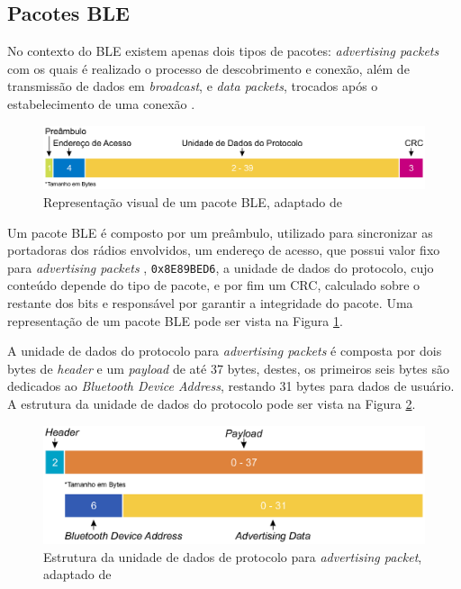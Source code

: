 \documentclass[a5paper]{ufsc-thesis}  %
\begin{document}
\subsection{Pacotes BLE}
No contexto do BLE existem apenas dois tipos de pacotes: \textit{advertising packets} com os quais é realizado o processo de descobrimento e conexão, além de transmissão de dados em \textit{broadcast}, e \textit{data packets}, trocados após o estabelecimento de uma conexão \cite{Townsend_2014}.

\begin{figure}[h]
    \centering
    \includegraphics[width=1\linewidth]{imagens/ble_packet.eps}
    \caption{Representação visual de um pacote BLE, adaptado de \cite{nordic_semi_academy}}
    \label{fig:ble_packet}
\end{figure}

Um pacote BLE é composto por um preâmbulo, utilizado para sincronizar as portadoras dos rádios envolvidos, um endereço de acesso, que possui valor fixo para \textit{advertising packets} \cite{bt_core}, \texttt{0x8E89BED6}, a unidade de dados do protocolo, cujo conteúdo depende do tipo de pacote, e por fim um CRC, calculado sobre o restante dos bits e responsável por garantir a integridade do pacote. Uma representação de um pacote BLE pode ser vista na Figura \ref{fig:ble_packet}.

A unidade de dados do protocolo para \textit{advertising packets} é composta por dois bytes de \textit{header} e um \textit{payload} de até 37 bytes, destes, os primeiros seis bytes são dedicados ao \textit{Bluetooth Device Address}, restando 31 bytes para dados de usuário. A estrutura da unidade de dados do protocolo pode ser vista na Figura \ref{fig:ble_adv_packet}. 

\begin{figure}[h]
    \centering
    \includegraphics[width=1\linewidth]{imagens/ble_adv_pdu.eps}
    \caption{Estrutura da unidade de dados de protocolo para \textit{advertising packet}, adaptado de \cite{nordic_semi_academy}}
    \label{fig:ble_adv_packet}
\end{figure}
\end{document}
